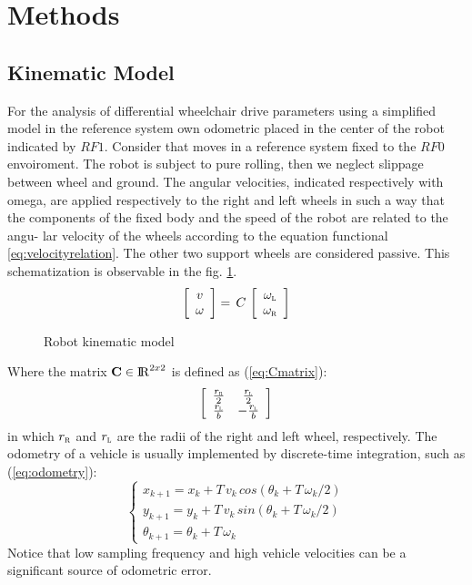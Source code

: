 \section{Methods}
\subsection{Kinematic Model}
For the analysis of differential wheelchair drive parameters using a simplified model in the reference system own odometric placed in the center of the robot indicated by $RF1$. Consider that moves in a reference system fixed to the $RF0$ envoiroment. The robot is subject to pure rolling, then we neglect slippage between wheel and ground. The angular velocities, indicated respectively with omega, are applied respectively to the right and left wheels in such a way that the components of the fixed body and the speed of the robot are related to the angu- lar velocity of the wheels according to the equation functional \ref{eq:velocityrelation}. The other two support wheels are considered passive. This schematization is observable in the fig. \ref{fig:model}.
\begin{equation}
\label{eq:velocityrelation}
	\left[ \begin{array}{cc}
				v	\\									
				\omega 							
			 \end{array} 
	\right]  =\, C\,
	\left[ \begin{array}{cc}
 				\omega_\textsc{l} \\ 
				\omega_\textsc{r}
			 \end{array} 
	\right]
\end{equation}

\begin{figure}[!h]
\centering
    \resizebox{.8\linewidth}{!}{}
\caption{Robot kinematic model}
\label{fig:model}
\end{figure}
\noindent Where the matrix $\textbf{C} \in \operatorname{\rm I\!R}^{2 x 2}$ is defined as (\ref{eq:Cmatrix}):
\begin{equation}
\label{eq:Cmatrix}
	\left[ \begin{array}{cc}
 				\frac{r_\textsc{r}}{2} &	\frac{r_\textsc{l}}{2} \\
				\frac{r_\textsc{l}}{b} &	-\frac{r_\textsc{l}}{b} 
			 \end{array} 
	\right]
\end{equation}
in which $r_\textsc{r}$ and $r_\textsc{l}$ are the radii of the right and left wheel, respectively.
The odometry of a vehicle is usually implemented by discrete-time integration, such as (\ref{eq:odometry}):
\begin{equation}
\label{eq:odometry}
	\begin{cases}
		x_{k+1} = x_{k} + T \, v_{k} \, cos(\theta_{k} + T \,\omega_{k}/2)\\
		y_{k+1} = y_{k} + T \, v_{k} \, sin(\theta_{k} + T \, \omega_{k}/2)\\
		\theta_{k+1} = \theta_{k} + T \, \omega_{k}
	\end{cases}
\end{equation}           
Notice that low sampling frequency and high vehicle velocities can be a significant source of odometric error.

